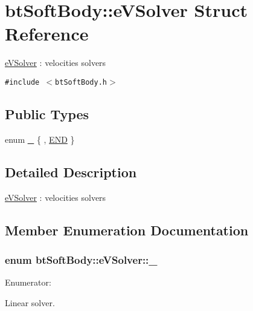 \hypertarget{structbt_soft_body_1_1e_v_solver}{
\section{btSoftBody::eVSolver Struct Reference}
\label{structbt_soft_body_1_1e_v_solver}
}
\hyperlink{structbt_soft_body_1_1e_v_solver}{eVSolver} : velocities solvers  


{\tt \#include $<$btSoftBody.h$>$}

\subsection*{Public Types}
\begin{CompactItemize}
\item 
enum \hyperlink{structbt_soft_body_1_1e_v_solver_d6a7083f91529d75cab91506cd63e088}{\_\-} \{ , \hyperlink{structbt_soft_body_1_1e_v_solver_d6a7083f91529d75cab91506cd63e088f9171d53f22882b6b27a94534ab72e01}{END}
 \}
\end{CompactItemize}


\subsection{Detailed Description}
\hyperlink{structbt_soft_body_1_1e_v_solver}{eVSolver} : velocities solvers 

\subsection{Member Enumeration Documentation}
\hypertarget{structbt_soft_body_1_1e_v_solver_d6a7083f91529d75cab91506cd63e088}{
\subsubsection[\_\-]{\setlength{\rightskip}{0pt plus 5cm}enum {\bf btSoftBody::eVSolver::\_\-}}}
\label{structbt_soft_body_1_1e_v_solver_d6a7083f91529d75cab91506cd63e088}


\begin{Desc}
\item[Enumerator: ]\par
\begin{description}
\item[{\em 
\hypertarget{structbt_soft_body_1_1e_v_solver_d6a7083f91529d75cab91506cd63e088f9171d53f22882b6b27a94534ab72e01}{
END}
\label{structbt_soft_body_1_1e_v_solver_d6a7083f91529d75cab91506cd63e088f9171d53f22882b6b27a94534ab72e01}
}]Linear solver. \end{description}
\end{Desc}



